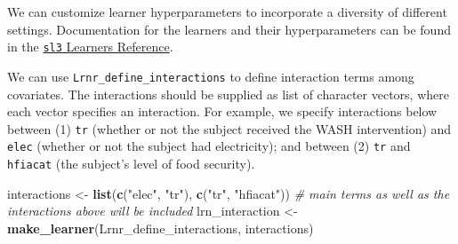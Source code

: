 \documentclass[12pt, krantz2,]{krantz}
\newenvironment{Shaded}{\begin{snugshade}}{\end{snugshade}}
\newcommand{\CommentTok}[1]{\textcolor[rgb]{0.37,0.37,0.37}{\textit{#1}}}
\newcommand{\DataTypeTok}[1]{\textcolor[rgb]{0.27,0.27,0.27}{#1}}
\newcommand{\DecValTok}[1]{\textcolor[rgb]{0.06,0.06,0.06}{#1}}
\newcommand{\FloatTok}[1]{\textcolor[rgb]{0.06,0.06,0.06}{#1}}
\newcommand{\KeywordTok}[1]{\textcolor[rgb]{0.27,0.27,0.27}{\textbf{#1}}}
\newcommand{\NormalTok}[1]{#1}
\newcommand{\OperatorTok}[1]{\textcolor[rgb]{0.43,0.43,0.43}{\textbf{#1}}}
\newcommand{\StringTok}[1]{\textcolor[rgb]{0.5,0.5,0.5}{#1}}
\theoremstyle{definition}
\theoremstyle{definition}
\theoremstyle{definition}
\newcommand{\1}{\mathbbm{1}}
\begin{document}
We can customize learner hyperparameters to incorporate a diversity of
different settings. Documentation for the learners and their hyperparameters
can be found in the \href{https://tlverse.org/sl3/reference/index.html\#section-sl-learners}{\texttt{sl3} Learners
Reference}.

\begin{Shaded}
\end{Shaded}

We can use \texttt{Lrnr\_define\_interactions} to define interaction terms among
covariates. The interactions should be supplied as list of character vectors,
where each vector specifies an interaction. For example, we specify
interactions below between (1) \texttt{tr} (whether or not the subject received the
WASH intervention) and \texttt{elec} (whether or not the subject had electricity); and
between (2) \texttt{tr} and \texttt{hfiacat} (the subject's level of food security).

\begin{Shaded}
\begin{Highlighting}[]
\NormalTok{interactions <-}\StringTok{ }\KeywordTok{list}\NormalTok{(}\KeywordTok{c}\NormalTok{(}\StringTok{"elec"}\NormalTok{, }\StringTok{"tr"}\NormalTok{), }\KeywordTok{c}\NormalTok{(}\StringTok{"tr"}\NormalTok{, }\StringTok{"hfiacat"}\NormalTok{))}
\CommentTok{# main terms as well as the interactions above will be included}
\NormalTok{lrn_interaction <-}\StringTok{ }\KeywordTok{make_learner}\NormalTok{(Lrnr_define_interactions, interactions)}
\end{Highlighting}
\end{Shaded}
\end{document}

